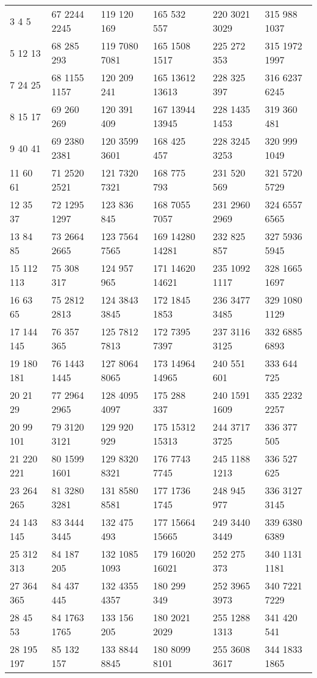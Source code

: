 \begin{center}
\footnotesize
\begin{longtable}{llllll}
3 4 5&67 2244 2245&119 120 169&165 532 557&220 3021 3029&315 988 1037\\
5 12 13&68 285 293&119 7080 7081&165 1508 1517&225 272 353&315 1972 1997\\
7 24 25&68 1155 1157&120 209 241&165 13612 13613&228 325 397&316 6237 6245\\
8 15 17&69 260 269&120 391 409&167 13944 13945&228 1435 1453&319 360 481\\
9 40 41&69 2380 2381&120 3599 3601&168 425 457&228 3245 3253&320 999 1049\\
11 60 61&71 2520 2521&121 7320 7321&168 775 793&231 520 569&321 5720 5729\\
12 35 37&72 1295 1297&123 836 845&168 7055 7057&231 2960 2969&324 6557 6565\\
13 84 85&73 2664 2665&123 7564 7565&169 14280 14281&232 825 857&327 5936 5945\\
15 112 113&75 308 317&124 957 965&171 14620 14621&235 1092 1117&328 1665 1697\\
16 63 65&75 2812 2813&124 3843 3845&172 1845 1853&236 3477 3485&329 1080 1129\\
17 144 145&76 357 365&125 7812 7813&172 7395 7397&237 3116 3125&332 6885 6893\\
19 180 181&76 1443 1445&127 8064 8065&173 14964 14965&240 551 601&333 644 725\\
20 21 29&77 2964 2965&128 4095 4097&175 288 337&240 1591 1609&335 2232 2257\\
20 99 101&79 3120 3121&129 920 929&175 15312 15313&244 3717 3725&336 377 505\\
21 220 221&80 1599 1601&129 8320 8321&176 7743 7745&245 1188 1213&336 527 625\\
23 264 265&81 3280 3281&131 8580 8581&177 1736 1745&248 945 977&336 3127 3145\\
24 143 145&83 3444 3445&132 475 493&177 15664 15665&249 3440 3449&339 6380 6389\\
25 312 313&84 187 205&132 1085 1093&179 16020 16021&252 275 373&340 1131 1181\\
27 364 365&84 437 445&132 4355 4357&180 299 349&252 3965 3973&340 7221 7229\\
28 45 53&84 1763 1765&133 156 205&180 2021 2029&255 1288 1313&341 420 541\\
28 195 197&85 132 157&133 8844 8845&180 8099 8101&255 3608 3617&344 1833 1865\\

\end{longtable}
\end{center}
